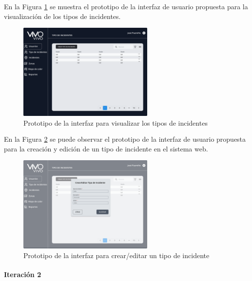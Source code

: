 En la Figura \ref{fig:prototipo-interfaz-usuario-web-1} se muestra el prototipo de la interfaz de usuario propuesta para
la visualización de los tipos de incidentes.

\begin{figure}[H]
      \centering
      \includegraphics[width=0.6\textwidth]{chapters/III-resultados-y-discusion/resources/images/prototipo-tabla-tipos-incidentes-web.png}
      \caption{Prototipo de la interfaz para visualizar los tipos de incidentes}
      \label{fig:prototipo-interfaz-usuario-web-1}
\end{figure}

En la Figura \ref{fig:prototipo-interfaz-usuario-web-2} se puede observar el prototipo de la interfaz de usuario propuesta
para la creación y edición de un tipo de incidente en el sistema web.

\begin{figure}[H]
      \centering
      \includegraphics[width=0.6\textwidth]{chapters/III-resultados-y-discusion/resources/images/prototipo-formulario-tipo-incidente-web.png}
      \caption{Prototipo de la interfaz para crear/editar un tipo de incidente}
      \label{fig:prototipo-interfaz-usuario-web-2}
\end{figure}


\paragraph{Iteración 2}

